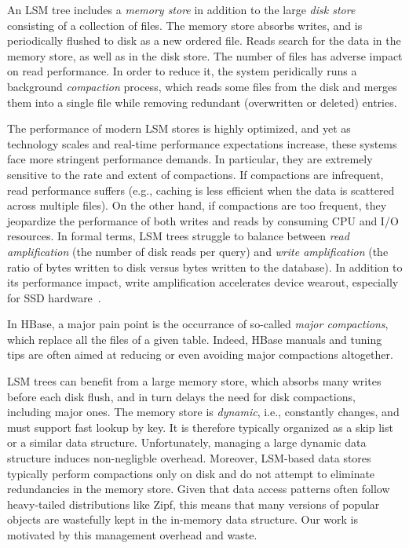 An LSM tree includes a \emph{memory store} in addition to the large \emph{disk store} consisting of a collection of files. 
The memory store absorbs writes, and is periodically flushed to disk as a new ordered file. Reads search for the data
in the memory store, as well as in the disk store. The number of files has adverse impact on read performance. 
In order to reduce it, the system peridically runs a background \emph{compaction} process, which reads some files from 
the disk and merges them into a single file while removing redundant (overwritten or deleted) entries.%

The performance of modern LSM stores is highly optimized, and yet as technology scales and real-time 
performance expectations increase, these systems face more stringent performance demands. In particular, 
they are extremely sensitive to the rate and extent of compactions. If compactions are infrequent, read performance
suffers (e.g., caching is less efficient when the data is scattered across multiple files). On the other hand, if 
compactions are too frequent, they jeopardize the performance of both writes and reads by consuming CPU 
and I/O resources. In formal terms, LSM trees struggle to balance between {\em read amplification} (the number 
of disk reads per query) and {\em write amplification} (the ratio of bytes written to disk versus bytes written to the 
database). In addition to its performance impact, write amplification accelerates device wearout, especially for SSD 
hardware~\cite{Hu:2009}. 


 
In HBase, a major pain point is the occurrance of so-called \emph{major compactions}, which replace all the files of a given table.
Indeed, HBase manuals and tuning tips are often aimed at reducing or even avoiding major compactions altogether.

LSM trees can benefit from a large memory store, which absorbs many writes before each disk flush, 
and in turn delays the need for disk compactions,  including major ones. 
The memory store is \emph{dynamic}, i.e., constantly changes, and must support fast lookup by key. 
It is therefore typically organized as a skip list
 or a similar data structure.  Unfortunately, managing a large dynamic data structure induces 
non-negligble  overhead. 
Moreover, 
LSM-based data stores typically perform compactions only on disk and do not attempt to eliminate redundancies in the memory store.
Given that data access patterns often follow heavy-tailed distributions like Zipf,  this means that many versions of popular objects are 
wastefully kept in the in-memory data structure. 
Our work is motivated by this management overhead and waste. 

